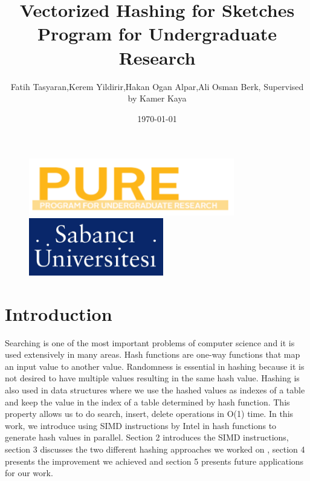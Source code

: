 \documentclass[11pt,oneside,a4paper]{article}
\title{\vspace*{40.0mm}
  \bf Vectorized Hashing for Sketches
         \vspace*{20.0mm} \\
  \vspace*{40.0mm}
  \Large\bf\sf Program for Undergraduate Research \vspace*{20.0mm}}
\author{\sf Fatih Tasyaran,Kerem Yildirir,Hakan Ogan Alpar,Ali Osman Berk, Supervised by Kamer Kaya}
\date{\sf \today}
\makeatletter
\def\cleardoublepage{\clearpage\if@twoside \ifodd\c@page\else%
\hbox{}%
\thispagestyle{empty}%
\clearpage%
\if@twocolumn\hbox{}\clearpage\fi\fi\fi}
\makeatother
\begin{document}
\begin{figure}
  \parbox[t]{40mm}{
    \begin{flushleft}
      \includegraphics[height=25mm]{pure.png}
    \end{flushleft}}
    \hspace{7cm}
  \parbox[t]{40mm}{
    \begin{flushright}
      \includegraphics[height=25mm]{sabanj.png}
    \end{flushright}}
\end{figure}

\maketitle
\thispagestyle{empty}
\raggedbottom

\cleardoublepage
{}
\setcounter{tocdepth}{2}
\tableofcontents


\section{Introduction}
\par Searching is one of the most important problems of computer science and it is used extensively in many areas. Hash functions are one-way functions that map an input value to another value. Randomness is essential in hashing because it is not desired to have multiple values resulting in the same hash value. Hashing is also used in  data structures where we use the hashed values as indexes of a table  and keep the value in the index of a table determined by hash function. This property allows us to do search, insert, delete operations in O(1) time. In this work, we introduce using SIMD instructions by Intel in hash functions to generate hash values in parallel. Section 2 introduces the  SIMD instructions,  section 3 discusses the two different hashing approaches we worked on , section 4 presents the improvement we achieved and section 5 presents future applications for our work.\cite{NIPS2017_7239}
\end{document}
